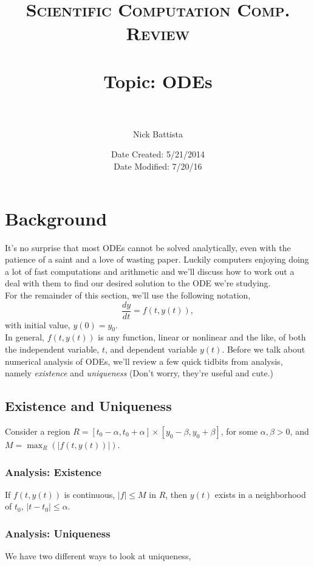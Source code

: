 \documentclass[paper=a4, fontsize=11pt]{scrartcl} %
\title{	
\normalfont \normalsize 
\textsc{Scientific Computation Comp. Review} \\ [25pt] %
\horrule{1pt} \\[0.05cm] %
\huge Topic: ODEs \\ %
\horrule{1pt} \\[0.05cm] %
}
\author{Nick Battista} %
\date{\normalsize Date Created: 5/21/2014 \\ Date Modified: 7/20/16} %
\numberwithin{equation}{section} %
\numberwithin{figure}{section} %
\numberwithin{table}{section} %
\begin{document}
\maketitle %


\section{Background}

It's no surprise that most ODEs cannot be solved analytically, even with the patience of a saint and a love of wasting paper. Luckily computers enjoying doing a lot of fast computations and arithmetic and we'll discuss how to work out a deal with them to find our desired solution to the ODE we're studying.\\

For the remainder of this section, we'll use the following notation, $$\frac{dy}{dt} = f(t, y(t) ),$$ with initial value, $y(0) = y_0$. \\

In general, $f(t,y(t))$ is any function, linear or nonlinear and the like, of both the independent variable, $t$, and dependent variable $y(t)$. Before we talk about numerical analysis of ODEs, we'll review a few quick tidbits from analysis, namely \emph{existence} and \emph{uniqueness} (Don't worry, they're useful and cute.)

\subsection{Existence and Uniqueness}

Consider a region $R = [t_0-\alpha,t_0+\alpha]\times[y_0-\beta,y_0+\beta]$, for some $\alpha,\beta >0$, and $M=\max_R( |f(t,y(t))| )$. 

\subsubsection{Analysis: Existence} If $f(t,y(t))$ is continuous, $|f|\leq M$ in $R$, then $y(t)$ exists in a neighborhood of $t_0$, $|t-t_0|\leq \alpha$.

\subsubsection{Analysis: Uniqueness} We have two different ways to look at uniqueness,
\end{document}

